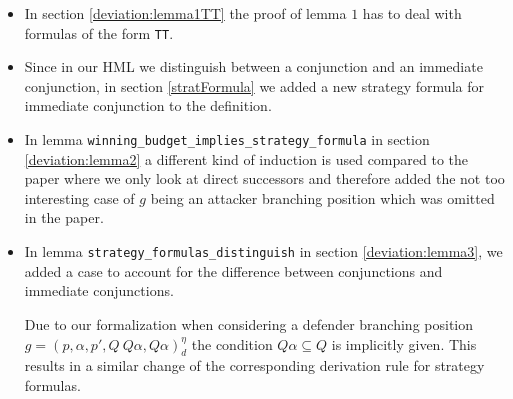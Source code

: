 \begin{itemize}
    \item In section \ref{deviation:lemma1TT} the proof of lemma $1$ has to deal with formulas of the form \texttt{TT}. 
    
    \item Since in our HML we distinguish between a conjunction and an immediate conjunction, in section \ref{stratFormula} 
    we added a new strategy formula for immediate conjunction to the definition.
    
    \item In lemma \texttt{winning\_budget\_implies\_strategy\_formula} in section \ref{deviation:lemma2} a different kind of induction is used compared to the paper 
    where we only look at direct successors and therefore added the not too interesting case of $g$ being an 
    attacker branching position which was omitted in the paper.
    
    \item In lemma \texttt{strategy\_formulas\_distinguish} in section \ref{deviation:lemma3}, we added a case to account for the difference between 
    conjunctions and immediate conjunctions. 
    
    Due to our formalization when considering a defender branching position $g=(p,\alpha ,p', Q \ Q\alpha, Q\alpha)_d^\eta$ the condition 
    $Q \alpha \subseteq Q$ is implicitly given.
    This results in a similar change of the corresponding derivation rule for strategy formulas.
\end{itemize}

